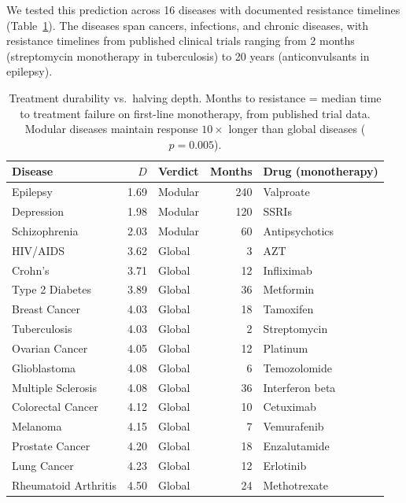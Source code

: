 \documentclass[11pt,a4paper]{article}
\begin{document}
We tested this prediction across 16 diseases with documented resistance timelines (Table~\ref{tab:resistance}). The diseases span cancers, infections, and chronic diseases, with resistance timelines from published clinical trials ranging from 2 months (streptomycin monotherapy in tuberculosis) to 20 years (anticonvulsants in epilepsy).

\begin{table}[h]
\centering
\caption{Treatment durability vs.\ halving depth. Months to resistance = median time to treatment failure on first-line monotherapy, from published trial data. Modular diseases maintain response $10\times$ longer than global diseases ($p = 0.005$).}
\label{tab:resistance}
\begin{tabular}{l r l r l}
\toprule
\textbf{Disease} & \textbf{$D$} & \textbf{Verdict} & \textbf{Months} & \textbf{Drug (monotherapy)} \\
\midrule
Epilepsy & 1.69 & Modular & 240 & Valproate \\
Depression & 1.98 & Modular & 120 & SSRIs \\
Schizophrenia & 2.03 & Modular & 60 & Antipsychotics \\
\midrule
HIV/AIDS & 3.62 & Global & 3 & AZT \\
Crohn's & 3.71 & Global & 12 & Infliximab \\
Type 2 Diabetes & 3.89 & Global & 36 & Metformin \\
Breast Cancer & 4.03 & Global & 18 & Tamoxifen \\
Tuberculosis & 4.03 & Global & 2 & Streptomycin \\
Ovarian Cancer & 4.05 & Global & 12 & Platinum \\
Glioblastoma & 4.08 & Global & 6 & Temozolomide \\
Multiple Sclerosis & 4.08 & Global & 36 & Interferon beta \\
Colorectal Cancer & 4.12 & Global & 10 & Cetuximab \\
Melanoma & 4.15 & Global & 7 & Vemurafenib \\
Prostate Cancer & 4.20 & Global & 18 & Enzalutamide \\
Lung Cancer & 4.23 & Global & 12 & Erlotinib \\
Rheumatoid Arthritis & 4.50 & Global & 24 & Methotrexate \\
\bottomrule
\end{tabular}
\end{table}
\end{document}

